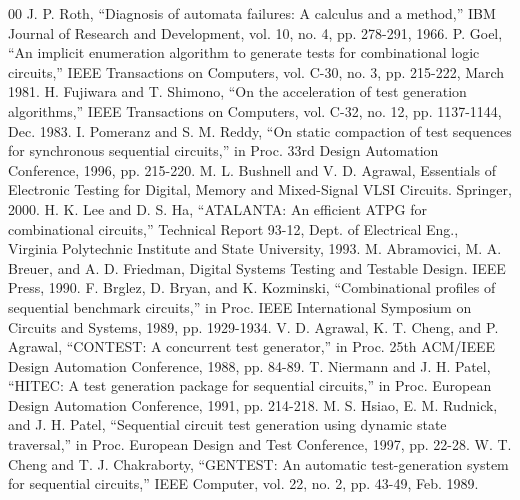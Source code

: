 \documentclass[conference]{IEEEtran}
\begin{document}
\begin{thebibliography}{00}
 J. P. Roth, ``Diagnosis of automata failures: A calculus and a method,'' IBM Journal of Research and Development, vol. 10, no. 4, pp. 278-291, 1966.
 P. Goel, ``An implicit enumeration algorithm to generate tests for combinational logic circuits,'' IEEE Transactions on Computers, vol. C-30, no. 3, pp. 215-222, March 1981.
 H. Fujiwara and T. Shimono, ``On the acceleration of test generation algorithms,'' IEEE Transactions on Computers, vol. C-32, no. 12, pp. 1137-1144, Dec. 1983.
 I. Pomeranz and S. M. Reddy, ``On static compaction of test sequences for synchronous sequential circuits,'' in Proc. 33rd Design Automation Conference, 1996, pp. 215-220.
 M. L. Bushnell and V. D. Agrawal, Essentials of Electronic Testing for Digital, Memory and Mixed-Signal VLSI Circuits. Springer, 2000.
 H. K. Lee and D. S. Ha, ``ATALANTA: An efficient ATPG for combinational circuits,'' Technical Report 93-12, Dept. of Electrical Eng., Virginia Polytechnic Institute and State University, 1993.
 M. Abramovici, M. A. Breuer, and A. D. Friedman, Digital Systems Testing and Testable Design. IEEE Press, 1990.
 F. Brglez, D. Bryan, and K. Kozminski, ``Combinational profiles of sequential benchmark circuits,'' in Proc. IEEE International Symposium on Circuits and Systems, 1989, pp. 1929-1934.
 V. D. Agrawal, K. T. Cheng, and P. Agrawal, ``CONTEST: A concurrent test generator,'' in Proc. 25th ACM/IEEE Design Automation Conference, 1988, pp. 84-89.
 T. Niermann and J. H. Patel, ``HITEC: A test generation package for sequential circuits,'' in Proc. European Design Automation Conference, 1991, pp. 214-218.
 M. S. Hsiao, E. M. Rudnick, and J. H. Patel, ``Sequential circuit test generation using dynamic state traversal,'' in Proc. European Design and Test Conference, 1997, pp. 22-28.
 W. T. Cheng and T. J. Chakraborty, ``GENTEST: An automatic test-generation system for sequential circuits,'' IEEE Computer, vol. 22, no. 2, pp. 43-49, Feb. 1989.
\end{thebibliography}
\end{document}
